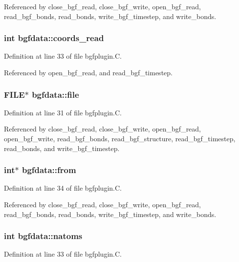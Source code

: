Referenced by close\_\-bgf\_\-read, close\_\-bgf\_\-write, open\_\-bgf\_\-read, read\_\-bgf\_\-bonds, read\_\-bonds, write\_\-bgf\_\-timestep, and write\_\-bonds.
\subsubsection{\setlength{\rightskip}{0pt plus 5cm}int bgfdata::coords\_\-read}\label{structbgfdata_m5}




Definition at line 33 of file bgfplugin.C.

Referenced by open\_\-bgf\_\-read, and read\_\-bgf\_\-timestep.
\subsubsection{\setlength{\rightskip}{0pt plus 5cm}FILE$\ast$ bgfdata::file}\label{structbgfdata_m0}




Definition at line 31 of file bgfplugin.C.

Referenced by close\_\-bgf\_\-read, close\_\-bgf\_\-write, open\_\-bgf\_\-read, open\_\-bgf\_\-write, read\_\-bgf\_\-bonds, read\_\-bgf\_\-structure, read\_\-bgf\_\-timestep, read\_\-bonds, and write\_\-bgf\_\-timestep.
\subsubsection{\setlength{\rightskip}{0pt plus 5cm}int$\ast$ bgfdata::from}\label{structbgfdata_m6}




Definition at line 34 of file bgfplugin.C.

Referenced by close\_\-bgf\_\-read, close\_\-bgf\_\-write, open\_\-bgf\_\-read, read\_\-bgf\_\-bonds, read\_\-bonds, write\_\-bgf\_\-timestep, and write\_\-bonds.
\subsubsection{\setlength{\rightskip}{0pt plus 5cm}int bgfdata::natoms}\label{structbgfdata_m2}




Definition at line 33 of file bgfplugin.C.


